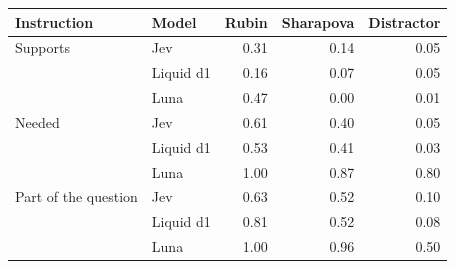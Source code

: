 \begin{tabular}{llrrr}
\toprule
Instruction & Model & Rubin & Sharapova & Distractor \\
\midrule
Supports & Jev & 0.31 & 0.14 & 0.05 \\
 & Liquid d1 & 0.16 & 0.07 & 0.05 \\
 & Luna & 0.47 & 0.00 & 0.01 \\
\midrule
Needed & Jev & 0.61 & 0.40 & 0.05 \\
 & Liquid d1 & 0.53 & 0.41 & 0.03 \\
 & Luna & 1.00 & 0.87 & 0.80 \\
\midrule
Part of the question & Jev & 0.63 & 0.52 & 0.10 \\
 & Liquid d1 & 0.81 & 0.52 & 0.08 \\
 & Luna & 1.00 & 0.96 & 0.50 \\
\bottomrule
\end{tabular}%

